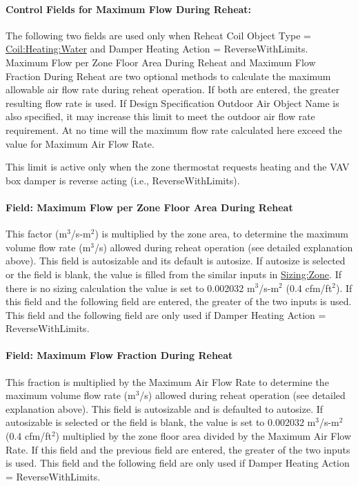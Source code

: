 \paragraph{Control Fields for Maximum Flow During Reheat:}\label{control-fields-for-maximum-flow-during-reheat}

The following two fields are used only when Reheat Coil Object Type = \hyperref[coilheatingwater]{Coil:Heating:Water} and Damper Heating Action = ReverseWithLimits. Maximum Flow per Zone Floor Area During Reheat and Maximum Flow Fraction During Reheat are two optional methods to calculate the maximum allowable air flow rate during reheat operation. If both are entered, the greater resulting flow rate is used. If Design Specification Outdoor Air Object Name is also specified, it may increase this limit to meet the outdoor air flow rate requirement. At no time will the maximum flow rate calculated here exceed the value for Maximum Air Flow Rate.

This limit is active only when the zone thermostat requests heating and the VAV box damper is reverse acting (i.e., ReverseWithLimits).

\paragraph{Field: Maximum Flow per Zone Floor Area During Reheat}\label{field-maximum-flow-per-zone-floor-area-during-reheat}

This factor (m\(^{3}\)/s-m\(^{2}\)) is multiplied by the zone area, to determine the maximum volume flow rate (m\(^{3}\)/s) allowed during reheat operation (see detailed explanation above). This field is autosizable and its default is autosize. If autosize is selected or the field is blank, the value is filled from the similar inputs in \hyperref[sizingzone]{Sizing:Zone}. If there is no sizing calculation the value is set to 0.002032 m\(^{3}\)/s-m\(^{2}\) (0.4 cfm/ft\(^{2}\)). If this field and the following field are entered, the greater of the two inputs is used. This field and the following field are only used if Damper Heating Action = ReverseWithLimits.

\paragraph{Field: Maximum Flow Fraction During Reheat}\label{field-maximum-flow-fraction-during-reheat}

This fraction is multiplied by the Maximum Air Flow Rate to determine the maximum volume flow rate (m\(^{3}\)/s) allowed during reheat operation (see detailed explanation above). This field is autosizable and is defaulted to autosize. If autosizable is selected or the field is blank, the value is set to 0.002032 m\(^{3}\)/s-m\(^{2}\) (0.4 cfm/ft\(^{2}\)) multiplied by the zone floor area divided by the Maximum Air Flow Rate. If this field and the previous field are entered, the greater of the two inputs is used. This field and the following field are only used if Damper Heating Action = ReverseWithLimits.

